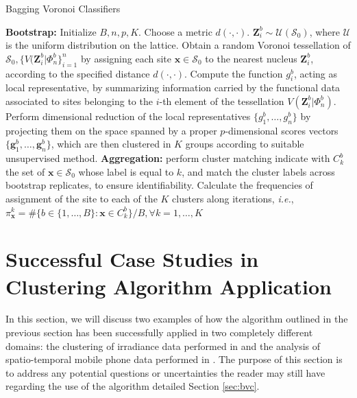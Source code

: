 \begin{algorithm}[H]
    \caption{Bagging Voronoi Classifiers}
    \label{alg:bvc}
    \begin{algorithmic}[1]
    \STATE \textbf{Bootstrap:}
    \STATE Initialize $B, n, p, K$. Choose a metric $d(\cdot,\cdot).$
    \STATE $\mathbf{Z}_i^b\sim\mathcal{U}(\mathcal{S}_0)$, where $\mathcal{U}$ is the uniform distribution on the lattice. Obtain a random Voronoi tessellation of $\mathcal{S}_0, \{V(\mathbf{Z}_i^b|\Phi_n^b\}^n_{i=1}$ by assigning each site $\mathbf{x}\in \mathcal{S}_0$ to the nearest nucleus $\mathbf{Z}_i^b$, according to the specified distance $d(\cdot,\cdot).$
    \ENDFOR
    \STATE Compute the function $g_i^b$, acting as local representative, by summarizing information carried by the functional data associated to sites belonging to the $i$-th element of the tessellation $V(\mathbf{Z}_i^b|\Phi_n^b)$.
    \ENDFOR
    \STATE Perform dimensional reduction of the local representatives $\{g_1^b,\dots, g_n^b\}$ by projecting them on the space spanned by a proper $p$-dimensional scores vectors $\{\mathbf{g}_1^b,\dots, \mathbf{g}_n^b\}$, which are then clustered in $K$ groups according to suitable unsupervised method.
    \ENDFOR
    \STATE \textbf{Aggregation:} perform cluster matching
    \STATE indicate with $C_k^b$ the set of $\mathbf{x} \in \mathcal{S}_0$ whose label is equal to $k$, and match the cluster labels across bootstrap replicates, to ensure identifiability.
    \ENDFOR
    \ENDFOR
    \STATE Calculate the frequencies of assignment of the site to each of the $K$ clusters along iterations, \textit{i.e.}, $\pi_{\mathbf{x}}^k=\#\{b\in\{1,\dots,B\}:\mathbf{x}\in C_k^b\}/B, \forall k=1,\dots,K$
    \ENDFOR
    \end{algorithmic}
\end{algorithm} 


\section{Successful Case Studies in Clustering Algorithm Application}
\label{sec:bcv-cases}
In this section, we will discuss two examples of how the algorithm outlined in the previous section has been successfully applied in two completely different domains: the clustering of irradiance data performed in \citeauthor{secchi_bagging_2013} \citeyear{secchi_bagging_2013} and the analysis of spatio-temporal mobile phone data performed in \citeauthor{secchi_analysis_2015} \citeyear{secchi_analysis_2015}. The purpose of this section is to address any potential questions or uncertainties the reader may still have regarding the use of the algorithm detailed Section \ref{sec:bvc}.

